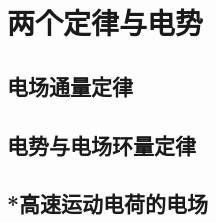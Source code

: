 

\section{两个定律与电势}\label{10-2}

\subsection{电场通量定律}\label{10-2-1}

\subsection{电势与电场环量定律}\label{10-2-2}

\subsection{*高速运动电荷的电场}\label{10-2-3}